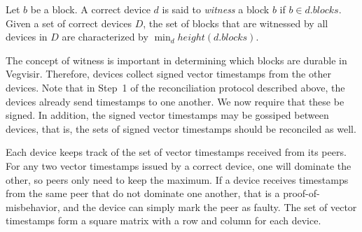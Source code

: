 \documentclass{article}
\begin{document}
Let $b$ be a block.  A correct device $d$ is said to \emph{witness} a block $b$ if $b \in d.\mathit{blocks}$.
Given a set of correct devices $D$, the set of blocks that are witnessed by all devices in $D$ are
characterized by $\min_d \mathit{height}(d.\mathit{blocks})$.

The concept of witness is important in determining which blocks are durable in Vegvisir.
Therefore, devices collect signed vector timestamps from the other devices.  Note that in Step~1
of the reconciliation protocol described above, the devices already send timestamps to one another.
We now require that these be signed.  In addition, the signed vector timestamps may be gossiped
between devices, that is, the sets of signed vector timestamps should be reconciled as well.

Each device keeps track of the set of vector timestamps received from its peers.  For any two
vector timestamps issued by a correct device, one will dominate the other, so peers only need to
keep the maximum.  If a device receives timestamps from the same peer that do not dominate one
another, that is a proof-of-misbehavior, and the device can simply mark the peer as faulty.
The set of vector timestamps form a square matrix with a row and column for each device.
\end{document}
